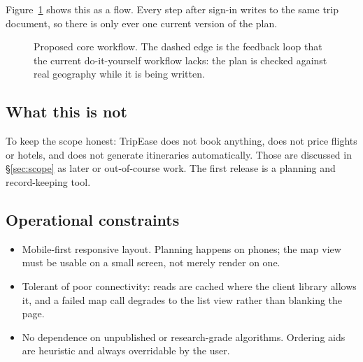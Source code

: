 \documentclass[11pt,a4paper]{article}
\begin{document}
Figure~\ref{fig:workflow} shows this as a flow. Every
step after sign-in writes to the same trip document, so
there is only ever one current version of the plan.

\begin{figure}[htbp]
\centering
{}
\caption{Proposed core workflow. The dashed edge is the
  feedback loop that the current do-it-yourself
  workflow lacks: the plan is checked against real
  geography while it is being written.}
\label{fig:workflow}
\end{figure}

\subsection{What this is not}
To keep the scope honest: TripEase does not book
anything, does not price flights or hotels, and does
not generate itineraries automatically. Those are
discussed in \S\ref{sec:scope} as later or
out-of-course work. The first release is a planning and
record-keeping tool.

\subsection{Operational constraints}
\begin{itemize}[leftmargin=0.7cm]
    \item Mobile-first responsive layout. Planning
      happens on phones; the map view must be usable on
      a small screen, not merely render on one.
    \item Tolerant of poor connectivity: reads are
      cached where the client library allows it, and a
      failed map call degrades to the list view rather
      than blanking the page.
    \item No dependence on unpublished or research-grade
      algorithms. Ordering aids are heuristic and always
      overridable by the user.
\end{itemize}
\end{document}
